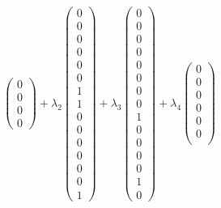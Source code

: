 \begin{align*}
\begin{pmatrix}
             0 \\
             0 \\
             0 \\
             0
           \end{pmatrix}
         + \lambda_2
           \begin{pmatrix}
             0 \\
             0 \\
             0 \\
             0 \\
             0 \\
             0 \\
             1 \\
             1 \\
             0 \\
             0 \\
             0 \\
             0 \\
             0 \\
             0 \\
             1
           \end{pmatrix}
         + \lambda_3
           \begin{pmatrix}
             0 \\
             0 \\
             0 \\
             0 \\
             0 \\
             0 \\
             0 \\
             0 \\
             1 \\
             0 \\
             0 \\
             0 \\
             0 \\
             1 \\
             0
           \end{pmatrix}
         + \lambda_4
           \begin{pmatrix}
             0 \\
             0 \\
             0 \\
             0 \\
             0 \\
             0 \\

\end{pmatrix}
\end{align*}
